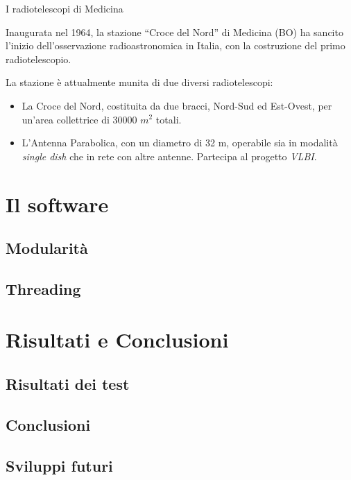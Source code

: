 \documentclass[red]{beamer}
\begin{document}
\begin{frame}{I radiotelescopi di Medicina}
	\transdissolve<2-3>
	\begin{figure}
		\label{fig:rtscopes}
	\end{figure}
			Inaugurata nel 1964, la stazione ``Croce del Nord'' di Medicina (BO)
			ha sancito l'inizio dell'osservazione radioastronomica in Italia,
			con la costruzione del primo radiotelescopio.

			La stazione è attualmente munita di due diversi radiotelescopi:
			\pause
			\begin{itemize}[<+->]
				\item La \alert{Croce del Nord}, costituita da due bracci,
					Nord-Sud ed Est-Ovest, per un'area collettrice di 30000
					$m^2$ totali.
				\item L'\alert{Antenna Parabolica}, con un diametro di 32 m,
					operabile sia in modalità \emph{single dish} che in rete con
					altre antenne. Partecipa al progetto \emph{VLBI}.
			\end{itemize}

\end{frame}

\section{Il software}
\subsection{Modularità}
\subsection{Threading}
\section{Risultati e Conclusioni}
\subsection{Risultati dei test}
\subsection{Conclusioni}
\subsection{Sviluppi futuri}
\end{document}
